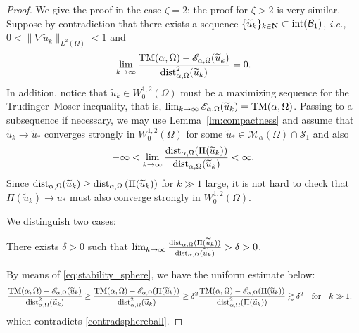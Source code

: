 \documentclass[reqno,11pt]{amsart}
\theoremstyle{definition}
\begin{document}
\begin{proof} We give the proof in the case $\zeta=2$; the proof for $\zeta>2$ is 
very similar. 
Suppose by contradiction that there exists a sequence $\{\widetilde{u}_k\}_{k\in\mathbf{N}}
\subset {\rm int}(\mathcal{B}_1)$, {\it i.e.,} $0<\|\nabla \widetilde{u}_k\|_{L^2(\Omega)}<1$ and 
\begin{equation}\label{contradsphereball}
    \lim_{k\rightarrow \infty}\frac{{\rm TM}({\alpha},\Omega) - \mathscr{E}_{\alpha, \Omega} (\widetilde{u}_k)}{{\rm dist}_{\alpha,\Omega}^2(\widetilde{u}_k)}=0.
\end{equation}
In addition, notice that $\widetilde{u}_k\in W^{1,2}_0(\Omega)$ must be a maximizing sequence  for the Trudinger--Moser inequality, that is, $\lim_{k\to\infty}\mathscr{E}_{\alpha,\Omega}(\widetilde{u}_k)={\rm TM}({\alpha},\Omega)$. 
Passing to a subsequence if necessary, we may use Lemma~\ref{lm:compactness} and assume that $\widetilde{u}_k\to \widetilde{u}_*$ converges strongly in $W^{1,2}_0(\Omega)$ for some $\widetilde{u}_*\in \mathcal{M}_{\alpha}(\Omega)\cap\mathcal{S}_1$ and also
\[
-\infty<\lim_{k \rightarrow \infty}\frac{{\rm dist}_{\alpha,\Omega}(\Pi(\widetilde{u}_k))}{{\rm dist}_{\alpha,\Omega}(\widetilde{u}_k)}<\infty.
\]
Since ${\rm dist}_{\alpha,\Omega}(\widetilde{u}_k)\geq  {\rm dist}_{\alpha,\Omega}\left(\Pi(\widetilde{u}_k)\right)$ for $k\gg1$ large, it is not hard to check that $\Pi(\widetilde{u}_k)\to u_*$ must also converge strongly in $W^{1,2}_0(\Omega)$.

We distinguish two cases:

 There exists $\delta>0$ such that $\lim_{k \rightarrow \infty}\frac{{\rm dist}_{\alpha,\Omega}(\Pi(\widetilde{u}_k))}{{\rm dist}_{\alpha,\Omega}(\widetilde{u}_k)}>\delta>0$.

\noindent By means of \eqref{eq:stability_sphere}, we have the uniform estimate below:
\begin{align*}
    \frac{{\rm TM}({\alpha},\Omega) - \mathscr{E}_{\alpha, \Omega} (\widetilde{u}_k)}{{\rm dist}_{\alpha,\Omega}^2(\widetilde{u}_k)}&\geq \frac{{\rm TM}({\alpha},\Omega) - \mathscr{E}_{\alpha, \Omega} (\Pi(\widetilde{u}_k))}{{\rm dist}_{\alpha,\Omega}^2(\widetilde{u}_k)}\geq \delta^2\frac{{\rm TM}({\alpha},\Omega) - \mathscr{E}_{\alpha, \Omega} (\Pi(\widetilde{u}_k))}{{\rm dist}_{\alpha,\Omega}^2(\Pi(\widetilde{u}_k))}\gtrsim \delta^2 \quad {\rm for} \quad k\gg1,
\end{align*}
which contradicts \eqref{contradsphereball}.


\end{proof}
\end{document}
